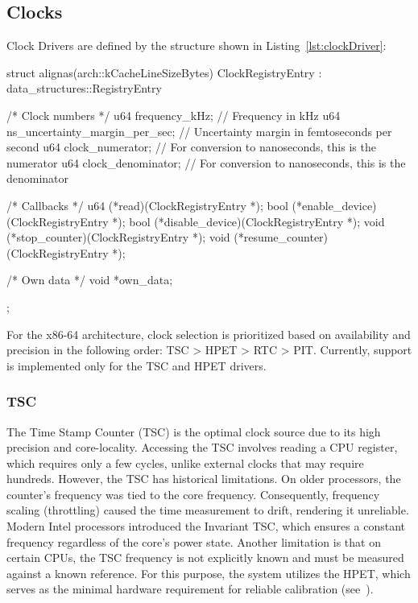 \documentclass[a4paper,10pt,twoside]{report}
\theoremstyle{definition}
\begin{document}
\subsection{Clocks}
\label{subsec:clocks}

Clock Drivers are defined by the structure shown in Listing~\ref{lst:clockDriver}:

\begin{cppcode}[caption={Clock Driver Structure}, label={lst:clockDriver}]
struct alignas(arch::kCacheLineSizeBytes) ClockRegistryEntry : data_structures::RegistryEntry {
  /* Clock numbers */
  u64 frequency_kHz; // Frequency in kHz
  u64 ns_uncertainty_margin_per_sec;  
    // Uncertainty margin in femtoseconds per second
  u64 clock_numerator; // For conversion to nanoseconds, this is the numerator
  u64 clock_denominator; // For conversion to nanoseconds, this is the denominator

  /* Callbacks */
  u64 (*read)(ClockRegistryEntry *);
  bool (*enable_device)(ClockRegistryEntry *);
  bool (*disable_device)(ClockRegistryEntry *);
  void (*stop_counter)(ClockRegistryEntry *);
  void (*resume_counter)(ClockRegistryEntry *);

  /* Own data */
  void *own_data;
};
\end{cppcode}

For the x86-64 architecture, clock selection is prioritized based on availability and precision in the following order: TSC > HPET > RTC > PIT. Currently, support is implemented only for the TSC and HPET drivers.

\subsubsection{TSC}
The Time Stamp Counter (TSC) is the optimal clock source due to its high precision and core-locality. Accessing the TSC involves reading a CPU register, which requires only a few cycles, unlike external clocks that may require hundreds. However, the TSC has historical limitations. On older processors, the counter's frequency was tied to the core frequency. Consequently, frequency scaling (throttling) caused the time measurement to drift, rendering it unreliable. Modern Intel processors introduced the Invariant TSC, which ensures a constant frequency regardless of the core's power state. Another limitation is that on certain CPUs, the TSC frequency is not explicitly known and must be measured against a known reference. For this purpose, the system utilizes the HPET, which serves as the minimal hardware requirement for reliable calibration (see~\cite{IntelManual-TSC}).
\end{document}
